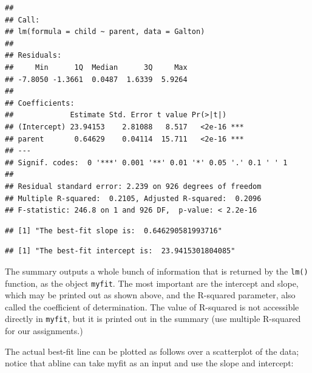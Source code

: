 \documentclass[
]{book}
\newenvironment{Shaded}{\begin{snugshade}}{\end{snugshade}}
\newcommand{\DecValTok}[1]{\textcolor[rgb]{0.00,0.00,0.81}{#1}}
\newcommand{\KeywordTok}[1]{\textcolor[rgb]{0.13,0.29,0.53}{\textbf{#1}}}
\newcommand{\NormalTok}[1]{#1}
\newcommand{\OperatorTok}[1]{\textcolor[rgb]{0.81,0.36,0.00}{\textbf{#1}}}
\newcommand{\StringTok}[1]{\textcolor[rgb]{0.31,0.60,0.02}{#1}}
\theoremstyle{definition}
\theoremstyle{definition}
\theoremstyle{definition}
\theoremstyle{remark}
\begin{document}
\begin{verbatim}
## 
## Call:
## lm(formula = child ~ parent, data = Galton)
## 
## Residuals:
##     Min      1Q  Median      3Q     Max 
## -7.8050 -1.3661  0.0487  1.6339  5.9264 
## 
## Coefficients:
##             Estimate Std. Error t value Pr(>|t|)    
## (Intercept) 23.94153    2.81088   8.517   <2e-16 ***
## parent       0.64629    0.04114  15.711   <2e-16 ***
## ---
## Signif. codes:  0 '***' 0.001 '**' 0.01 '*' 0.05 '.' 0.1 ' ' 1
## 
## Residual standard error: 2.239 on 926 degrees of freedom
## Multiple R-squared:  0.2105, Adjusted R-squared:  0.2096 
## F-statistic: 246.8 on 1 and 926 DF,  p-value: < 2.2e-16
\end{verbatim}

\begin{Shaded}
\end{Shaded}

\begin{verbatim}
## [1] "The best-fit slope is:  0.646290581993716"
\end{verbatim}

\begin{Shaded}
\end{Shaded}

\begin{verbatim}
## [1] "The best-fit intercept is:  23.9415301804085"
\end{verbatim}

The summary outputs a whole bunch of information that is returned by the \texttt{lm()} function, as the object \texttt{myfit}. The most important are the intercept and slope, which may be printed out as shown above, and the R-squared parameter, also called the coefficient of determination. The value of R-squared is not accessible directly in \texttt{myfit}, but it is printed out in the summary (use multiple R-squared for our assignments.)

The actual best-fit line can be plotted as follows over a scatterplot of the data; notice that abline can take myfit as an input and use the slope and intercept:
\end{document}
